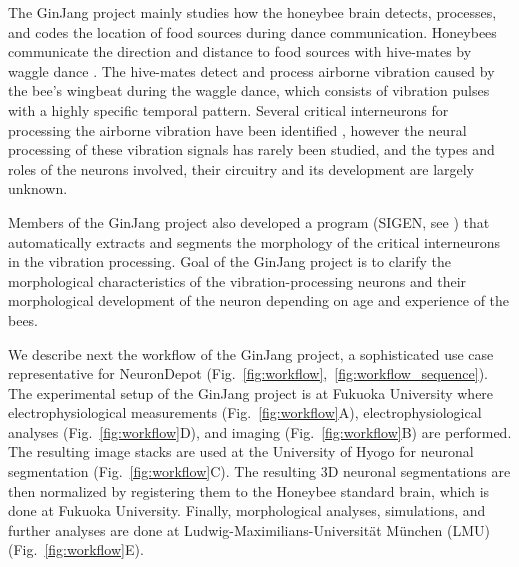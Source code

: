 \documentclass{frontiersSCNS} %
\begin{document}
The GinJang project mainly studies how the honeybee brain detects,
processes, and codes the location of food sources during dance communication.
Honeybees communicate the direction and distance to food sources with
hive-mates by waggle dance \citep{Frisch1967}. The hive-mates detect and
process airborne vibration caused by the bee's wingbeat during the waggle
dance, which consists of vibration pulses with a highly specific temporal
pattern. Several critical interneurons for processing the airborne vibration
have been identified \citep{Ai2007, Ai2009, Ai2010, Ai2012, Ai2013}, however
the neural processing of these vibration signals has rarely been studied, and
the types and roles of the neurons involved, their circuitry and its
development are largely unknown. 

Members of the GinJang project also developed a program (SIGEN, see
\citet{Minemoto}) that automatically extracts and segments the morphology of
the critical interneurons in the vibration processing. Goal of the GinJang
project is to clarify the morphological characteristics of the
vibration-processing neurons and their morphological development of the neuron
depending on age and experience of the bees.  

We describe next the workflow of the GinJang project, a sophisticated use case
representative for NeuronDepot
(Fig.~\ref{fig:workflow},~\ref{fig:workflow_sequence}). The experimental setup
of the GinJang project is at Fukuoka University where electrophysiological
measurements (Fig.~\ref{fig:workflow}A), electrophysiological analyses
(Fig.~\ref{fig:workflow}D), and imaging (Fig.~\ref{fig:workflow}B) are
performed. The resulting image stacks are used at the University of Hyogo for
neuronal segmentation (Fig.~\ref{fig:workflow}C). The resulting 3D neuronal
segmentations are then normalized by registering them to the Honeybee standard
brain, which is done at Fukuoka University. Finally, morphological analyses,
simulations, and further analyses are done at Ludwig-Maximilians-Universität
München (LMU) (Fig.~\ref{fig:workflow}E).
\end{document}
